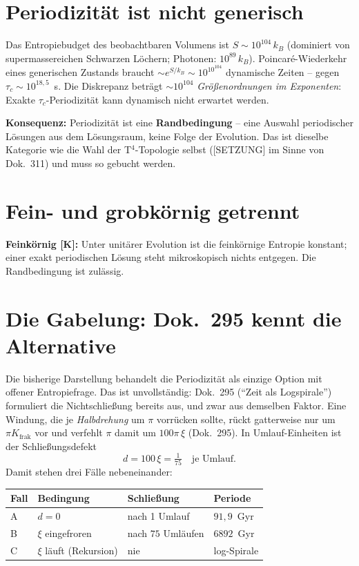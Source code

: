 \documentclass[11pt]{report}
\begin{document}
\section{Periodizität ist nicht generisch}

Das Entropiebudget des beobachtbaren Volumens ist
$S \sim 10^{104}\,k_B$ (dominiert von supermassereichen Schwarzen
Löchern; Photonen: $10^{89}\,k_B$). Poincaré-Wiederkehr eines
generischen Zustands braucht $\sim e^{S/k_B} \sim 10^{10^{104}}$
dynamische Zeiten -- gegen $\tau_c \sim 10^{18{,}5}$~s. Die
Diskrepanz beträgt $\sim 10^{104}$ \emph{Größenordnungen im
Exponenten}: Exakte $\tau_c$-Periodizität kann dynamisch nicht
erwartet werden.

\textbf{Konsequenz:} Periodizität ist eine
\textbf{Randbedingung} -- eine Auswahl periodischer Lösungen aus
dem Lösungsraum, keine Folge der Evolution. Das ist dieselbe
Kategorie wie die Wahl der T$^4$-Topologie selbst ([SETZUNG] im
Sinne von Dok.~311) und muss so gebucht werden.

\section{Fein- und grobkörnig getrennt}

\textbf{Feinkörnig [K]:} Unter unitärer Evolution ist die
feinkörnige Entropie konstant; einer exakt periodischen Lösung
steht mikroskopisch nichts entgegen. Die Randbedingung ist
zulässig.

\section{Die Gabelung: Dok.~295 kennt die Alternative}

Die bisherige Darstellung behandelt die Periodizität als einzige
Option mit offener Entropiefrage. Das ist unvollständig: Dok.~295
(\enquote{Zeit als Logspirale}) formuliert die Nichtschließung
bereits aus, und zwar aus demselben Faktor. Eine Windung, die je
\emph{Halbdrehung} um $\pi$ vorrücken sollte, rückt gatterweise
nur um $\pi K_\text{frak}$ vor und verfehlt $\pi$ damit um
$100\pi\,\xi$ (Dok.~295). In Umlauf-Einheiten ist der
Schließungsdefekt
\begin{equation}
  d = 100\,\xi = \tfrac{1}{75}\quad\text{je Umlauf.}
\end{equation}
Damit stehen drei Fälle nebeneinander:

\begin{center}
\begin{tabular}{llll}
\toprule
Fall & Bedingung & Schließung & Periode \\
\midrule
A & $d = 0$ & nach 1 Umlauf & $91{,}9$~Gyr \\
B & $\xi$ eingefroren & nach $75$ Umläufen & $6892$~Gyr \\
C & $\xi$ läuft (Rekursion) & nie & log-Spirale \\
\bottomrule
\end{tabular}
\end{center}
\end{document}
